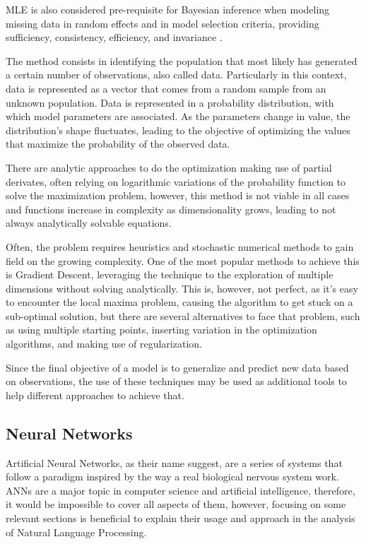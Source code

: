 MLE is also considered pre-requisite for Bayesian inference when modeling missing data in random effects and in model selection criteria, providing sufficiency, consistency, efficiency, and invariance \cite{myung2003}.

The method consists in identifying the population that most likely has generated a certain number of observations, also called data. Particularly in this context, data is represented as a vector that comes from a random sample from an unknown population. Data is represented in a probability distribution, with which model parameters are associated. As the parameters change in value, the distribution’s shape fluctuates, leading to the objective of optimizing the values that maximize the probability of the observed data.

There are analytic approaches to do the optimization making use of partial derivates, often relying on logarithmic variations of the probability function to solve the maximization problem, however, this method is not viable in all cases and functions increase in complexity as dimensionality grows, leading to not always analytically solvable equations.

Often, the problem requires heuristics and stochastic numerical methods to gain field on the growing complexity. One of the most popular methods to achieve this is Gradient Descent, leveraging the technique to the exploration of multiple dimensions without solving analytically. This is, however, not perfect, as it’s easy to encounter the local maxima problem, causing the algorithm to get stuck on a sub-optimal solution, but there are several alternatives to face that problem, such as using multiple starting points, inserting variation in the optimization algorithms, and making use of regularization.

Since the final objective of a model is to generalize and predict new data based on observations, the use of these techniques may be used as additional tools to help different approaches to achieve that.

\subsection{Neural Networks}

Artificial Neural Networks, as their name suggest, are a series of systems that follow a paradigm inspired by the way a real biological nervous system work. ANNs are a major topic in computer science and artificial intelligence, therefore, it would be impossible to cover all aspects of them, however, focusing on some relevant sections is beneficial to explain their usage and approach in the analysis of Natural Language Processing.  

